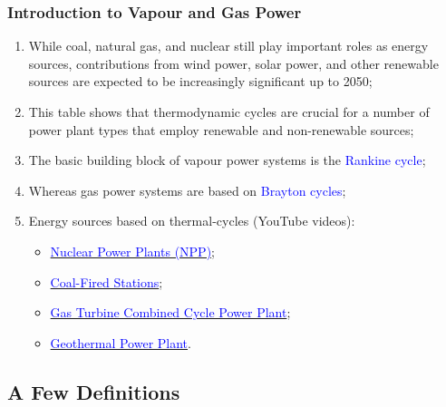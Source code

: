 \documentclass[10pt,compress]{beamer}
\newcommand{\blue}{\textcolor{blue}}
\begin{document}
\begin{frame}
 \frametitle{Introduction to Vapour and Gas Power}
    \begin{enumerate}%
       \item<1-> While coal, natural gas, and nuclear still play important roles as energy sources, contributions from wind power, solar power, and other renewable sources are expected to be increasingly significant up to 2050;
       \item<2-> This table shows that thermodynamic cycles are crucial for a number of power plant types that employ renewable and non-renewable sources;
       \item<3-> The basic building block of vapour power systems is the \blue{Rankine cycle};
       \item<3-> Whereas gas power systems are based on \blue{Brayton cycles};
       \item <4-> Energy sources based on thermal-cycles (YouTube videos):
         \begin{itemize}%
            \item \href{http://www.youtube.com/watch?v=_UwexvaCMWA}{\textcolor{blue}{Nuclear Power Plants (NPP)}};
            \item \href{http://www.youtube.com/watch?v=0mjT8ETB128}{\textcolor{blue}{Coal-Fired Stations}};
            \item \href{http://www.youtube.com/watch?v=oi1TRbiE_Kw}{\textcolor{blue}{Gas Turbine Combined Cycle Power Plant}};
            \item \href{https://www.youtube.com/watch?v=kjpp2MQffnw}{\textcolor{blue}{Geothermal Power Plant}}.
         \end{itemize}
    \end{enumerate}
 \normalsize
\end{frame}

\subsection{A Few Definitions}
\end{document}
